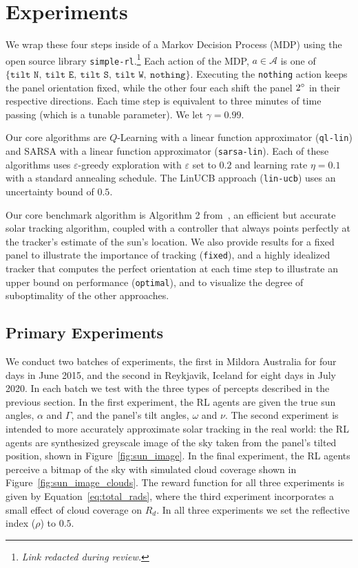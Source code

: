 \documentclass{article}
\newcommand{\mc}{\mathcal}
\begin{document}
{%
\section{Experiments}


We wrap these four steps inside of a Markov Decision Process (MDP) using the open source library \texttt{simple-rl}.\footnote{{\it Link redacted during review.}} Each action of the MDP, $a \in \mc{A}$ is one of $\{\texttt{tilt N},\ \texttt{tilt E},\ \texttt{tilt S},\ \texttt{tilt W},\ \texttt{nothing}\}$. Executing the \texttt{nothing} action keeps the panel orientation fixed, while the other four each shift the panel $2\degree$ in their respective directions. Each time step is equivalent to three minutes of time passing (which is a tunable parameter). We let $\gamma=0.99$.

Our core algorithms are $Q$-Learning with a linear function approximator (\texttt{ql-lin}) and SARSA with a linear function approximator (\texttt{sarsa-lin}). Each of these algorithms uses $\varepsilon$-greedy exploration with $\varepsilon$ set to $0.2$ and learning rate $\eta = 0.1$ with a standard annealing schedule. The LinUCB approach (\texttt{lin-ucb}) uses an uncertainty bound of $0.5$.

Our core benchmark algorithm is Algorithm 2 from~\citet{Grena2012}, an efficient but accurate solar tracking algorithm, coupled with a controller that always points perfectly at the tracker's estimate of the sun's location. We also provide results for a fixed panel to illustrate the importance of tracking (\texttt{fixed}), and a highly idealized tracker that computes the perfect orientation at each time step to illustrate an upper bound on performance (\texttt{optimal}), and to visualize the degree of suboptimality of the other approaches.





\subsection{Primary Experiments}
We conduct two batches of experiments, the first in Mildora Australia for four days in June 2015, and the second in Reykjavik, Iceland for eight days in July 2020. In each batch we test with the three types of percepts described in the previous section. In the first experiment, the RL agents are given the true sun angles, $\alpha$ and $\Gamma$, and the panel's tilt angles, $\omega$ and $\nu$. The second experiment is intended to more accurately approximate solar tracking in the real world: the RL agents are synthesized greyscale image of the sky taken from the panel's tilted position, shown in Figure~\ref{fig:sun_image}. In the final experiment, the RL agents perceive a bitmap of the sky with simulated cloud coverage shown in Figure~\ref{fig:sun_image_clouds}. The reward function for all three experiments is given by Equation~\ref{eq:total_rads}, where the third experiment incorporates a small effect of cloud coverage on $R_d$. In all three experiments we set the reflective index ($\rho$) to $0.5$.

}
\end{document}
